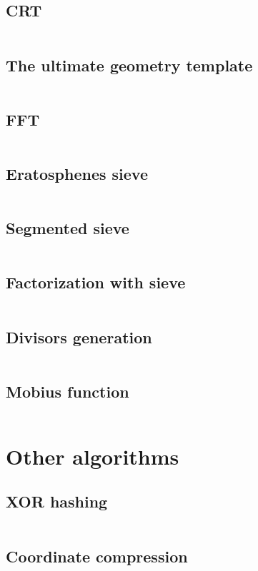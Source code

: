 ﻿\documentclass[10pt,twocolumn,oneside]{article}
\begin{document}
\subsection{CRT}
\inputminted[breaklines]{python}{Maths/crt.py}
\subsection{The ultimate geometry template}
\inputminted[breaklines]{python}{Maths/geometry.py}
\subsection{FFT}
\inputminted[breaklines]{python}{Maths/fft.py}
\subsection{Eratosphenes sieve}
\inputminted[breaklines]{cpp}{Maths/sieve.cpp}
\subsection{Segmented sieve}
\inputminted[breaklines]{cpp}{Maths/segmented sieve.cpp}
\subsection{Factorization with sieve}
\inputminted[breaklines]{cpp}{Maths/factorization with sieve.cpp}
\subsection{Divisors generation}
\inputminted[breaklines]{cpp}{Maths/divisors.cpp}
\subsection{Mobius function}
\inputminted[breaklines]{cpp}{Maths/mobius.cpp}

\section{Other algorithms}
\subsection{XOR hashing}
\inputminted[breaklines]{cpp}{Other algorithms/xor-hashing.cpp}
\subsection{Coordinate compression}
\inputminted[breaklines]{cpp}{Other algorithms/coordinate compression.cpp}
\end{document}
